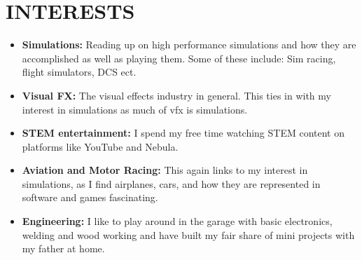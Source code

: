 \documentclass[11pt,a4paper]{article}
\begin{document}
\section{INTERESTS}
\begin{itemize}
    \item \textbf{Simulations:} Reading up on high performance simulations and
		how they are accomplished as well as playing them. Some of these
		include: Sim racing, flight simulators, DCS ect.
		
	\vspace{2pt}


    \item \textbf{Visual FX:} The visual effects industry in general. This ties
		in with my interest in simulations as much of vfx is simulations.
	\item \textbf{STEM entertainment:} I spend my free time watching STEM
		content on platforms like YouTube and Nebula.
		
	\vspace{2pt}


	\item \textbf{Aviation and Motor Racing:} This again links to my interest in
		simulations, as I find airplanes, cars, and how they are
		represented in software and games fascinating.
		
	\vspace{2pt}


	\item \textbf{Engineering:} I like to play around in the garage with basic
		electronics, welding and wood working and have built my fair share of
		mini projects with my father at home.
\end{itemize}
\end{document}

